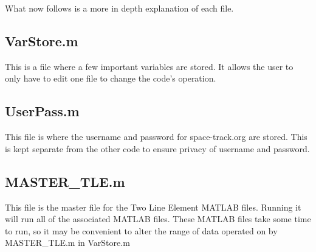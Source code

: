 \documentclass[12pt]{article}
\begin{document}
	What now follows is a more in depth explanation of each file. 
		\subsection{VarStore.m}
		This is a file where a few important variables are stored. It allows the user to only have to edit one file to change the code's operation.
		\subsection{UserPass.m}
		This file is where the username and password for space-track.org are stored. This is kept separate from the other code to ensure privacy of username and password. 
		\subsection{MASTER\_TLE.m}
		This file is the master file for the Two Line Element MATLAB files. Running it will run all of the associated MATLAB files. These MATLAB files take some time to run, so it may be convenient to alter the range of data operated on by MASTER\_TLE.m in VarStore.m
\end{document}
